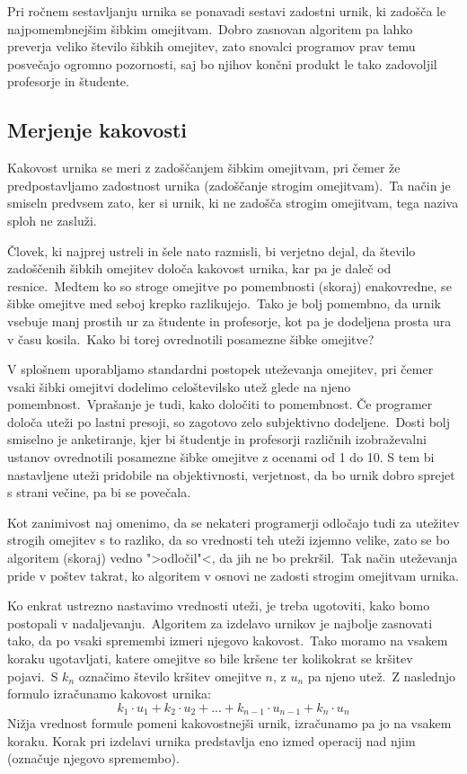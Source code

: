 \documentclass[a4paper]{article}
\begin{document}
Pri ročnem sestavljanju urnika se ponavadi sestavi zadostni urnik, ki zadošča le
najpomembnejšim šibkim omejitvam.\ Dobro zasnovan algoritem pa lahko preverja veliko
število šibkih omejitev, zato snovalci programov prav temu posvečajo ogromno pozornosti,
saj bo njihov končni produkt le tako zadovoljil profesorje in študente.

\subsection{Merjenje kakovosti} %

Kakovost urnika se meri z zadoščanjem šibkim omejitvam, pri čemer že predpostavljamo
zadostnost urnika (zadoščanje strogim omejitvam).\ Ta način je smiseln predvsem zato,
ker si urnik, ki ne zadošča strogim omejitvam, tega naziva sploh ne zasluži.

Človek, ki najprej ustreli in šele nato razmisli, bi verjetno dejal, da število
zadoščenih šibkih omejitev določa kakovost urnika, kar pa je daleč od resnice.\ Medtem
ko so stroge omejitve po pomembnosti (skoraj) enakovredne, se šibke omejitve med seboj
krepko razlikujejo.\ Tako je bolj pomembno, da urnik vsebuje manj prostih ur za
študente in profesorje, kot pa je dodeljena prosta ura v času kosila.\ Kako bi torej
ovrednotili posamezne šibke omejitve?

V splošnem uporabljamo standardni postopek uteževanja omejitev, pri čemer vsaki šibki
omejitvi dodelimo celoštevilsko utež glede na njeno pomembnost.\ Vprašanje je tudi, kako
določiti to pomembnost. Če programer določa uteži po lastni presoji, so zagotovo zelo
subjektivno dodeljene.\ Dosti bolj smiselno je anketiranje, kjer bi študentje in profesorji
različnih izobraževalni ustanov ovrednotili posamezne šibke omejitve z ocenami od 1 do 10.
S tem bi nastavljene uteži pridobile na objektivnosti, verjetnost, da bo urnik dobro
sprejet s strani večine, pa bi se povečala.

Kot zanimivost naj omenimo, da se nekateri programerji odločajo tudi za utežitev strogih
omejitev s to razliko, da so vrednosti teh uteži izjemno velike, zato se bo algoritem
(skoraj) vedno ">odločil"<, da jih ne bo prekršil.\ Tak način uteževanja pride v poštev
takrat, ko algoritem v osnovi ne zadosti strogim omejitvam urnika.

Ko enkrat ustrezno nastavimo vrednosti uteži, je treba ugotoviti, kako bomo postopali
v nadaljevanju.\ Algoritem za izdelavo urnikov je najbolje zasnovati tako, da po vsaki
spremembi izmeri njegovo kakovost.\ Tako moramo na vsakem koraku ugotavljati, katere
omejitve so bile kršene ter kolikokrat se kršitev pojavi.\ S $k_n$ označimo število
kršitev omejitve $n$, z $u_n$ pa njeno utež.\ Z naslednjo formulo izračunamo
kakovost urnika:
\[k_1 \cdot u_1+k_2\cdot u_2 + ... + k_{n-1}\cdot u_{n-1} + k_{n}\cdot u_{n}\]
Nižja vrednost formule pomeni kakovostnejši urnik, izračunamo pa jo na vsakem koraku.
Korak pri izdelavi urnika predstavlja eno izmed operacij nad njim (označuje njegovo
spremembo).
\end{document}
